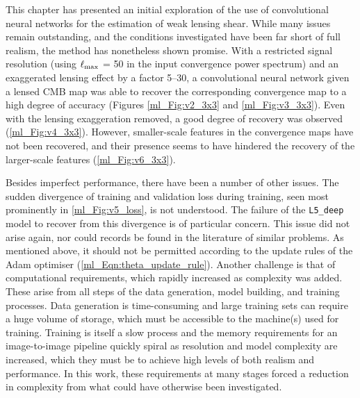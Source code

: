 This chapter has presented an initial exploration of the use of convolutional neural networks for the estimation of weak lensing shear. While many issues remain outstanding, and the conditions investigated have been far short of full realism, the method has nonetheless shown promise. With a restricted signal resolution (using $\ell_\text{max}$ = 50 in the input convergence power spectrum) and an exaggerated lensing effect by a factor 5--30, a convolutional neural network given a lensed CMB map was able to recover the corresponding convergence map to a high degree of accuracy (Figures \ref{ml_Fig:v2_3x3} and \ref{ml_Fig:v3_3x3}). Even with the lensing exaggeration removed, a good degree of recovery was observed (\autoref{ml_Fig:v4_3x3}). However, smaller-scale features in the convergence maps have not been recovered, and their presence seems to have hindered the recovery of the larger-scale features (\autoref{ml_Fig:v6_3x3}).

Besides imperfect performance, there have been a number of other issues. The sudden divergence of training and validation loss during training, seen most prominently in \autoref{ml_Fig:v5_loss}, is not understood. The failure of the \texttt{L5\_deep} model to recover from this divergence is of particular concern. This issue did not arise again, nor could records be found in the literature of similar problems. As mentioned above, it should not be permitted according to the update rules of the Adam optimiser (\autoref{ml_Eqn:theta_update_rule}). Another challenge is that of computational requirements, which rapidly increased as complexity was added. These arise from all steps of the data generation, model building, and training processes. Data generation is time-consuming and large training sets can require a huge volume of storage, which must be accessible to the machine(s) used for training. Training is itself a slow process and the memory requirements for an image-to-image pipeline quickly spiral as resolution and model complexity are increased, which they must be to achieve high levels of both realism and performance. In this work, these requirements at many stages forced a reduction in complexity from what could have otherwise been investigated.

